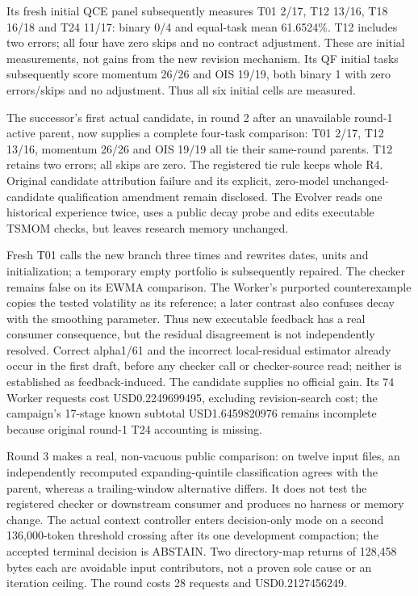 Its fresh initial QCE panel subsequently measures T01 2/17, T12 13/16,
T18 16/18 and T24 11/17: binary 0/4 and equal-task mean 61.6524\%.
T12 includes two errors; all four have zero skips and no contract adjustment.
These are initial measurements, not gains from the new revision mechanism.
Its QF initial tasks subsequently
score momentum 26/26 and OIS 19/19, both binary 1 with zero errors/skips and no
adjustment. Thus all six initial cells are measured.

The successor's first actual candidate, in round 2 after an unavailable
round-1 active parent, now supplies a complete four-task comparison:
T01 2/17, T12 13/16, momentum 26/26 and OIS 19/19 all tie their same-round
parents. T12 retains two errors; all skips are zero. The registered tie rule
keeps whole R4. Original candidate attribution failure and its explicit,
zero-model unchanged-candidate qualification amendment remain disclosed.
The Evolver reads one historical experience twice, uses a public decay probe
and edits executable TSMOM checks, but leaves research memory unchanged.

Fresh T01 calls the new branch three times and rewrites dates, units and
initialization; a temporary empty portfolio is subsequently repaired.
The checker remains false on its EWMA comparison. The Worker's purported
counterexample copies the tested volatility as its reference; a later
contrast also confuses decay with the smoothing parameter. Thus new executable
feedback has a real consumer consequence, but the residual disagreement is
not independently resolved. Correct alpha1/61 and the incorrect local-residual
estimator already occur in the first draft, before any checker call or
checker-source read; neither is established as feedback-induced. The candidate
supplies no official gain. Its 74 Worker requests cost USD0.2249699495,
excluding revision-search cost; the campaign's
17-stage known subtotal USD1.6459820976 remains incomplete because original
round-1 T24 accounting is missing.

Round 3 makes a real, non-vacuous public comparison: on twelve input files,
an independently recomputed expanding-quintile classification agrees with the
parent, whereas a trailing-window alternative differs. It does not test the
registered checker or downstream consumer and produces no harness or memory
change. The actual context controller enters decision-only mode on a second
136,000-token threshold crossing after its one development compaction;
the accepted terminal decision is ABSTAIN. Two directory-map returns of
128,458 bytes each are avoidable input contributors, not a proven sole cause
or an iteration ceiling. The round costs 28 requests and USD0.2127456249.

